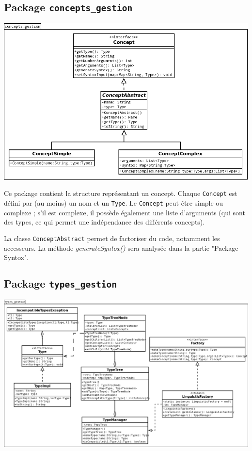 \documentclass[12pt]{report}
\begin{document}
\subsection{Package \texttt{concepts\_gestion}}

\begin{center}
\includegraphics[scale=0.5]{DiagLinguistic_concepts_gestion.png}
\end{center}

Ce package contient la structure représentant un concept. Chaque \texttt{Concept} est défini par (au moins) un nom et un \texttt{Type}. Le \texttt{Concept} peut être simple ou complexe ; s'il est complexe, il possède également une liste d'arguments (qui sont des types, ce qui permet une indépendance des différents concepts). %

La classe \texttt{ConceptAbstract} permet de factoriser du code, notamment les accesseurs.
La méthode \emph{generateSyntox()} sera analysée dans la partie "Package Syntox".

\subsection{Package \texttt{types\_gestion}}

\begin{center}
\includegraphics[scale=0.43]{DiagLinguistic_types_gestion.png}
\end{center}
\end{document}
